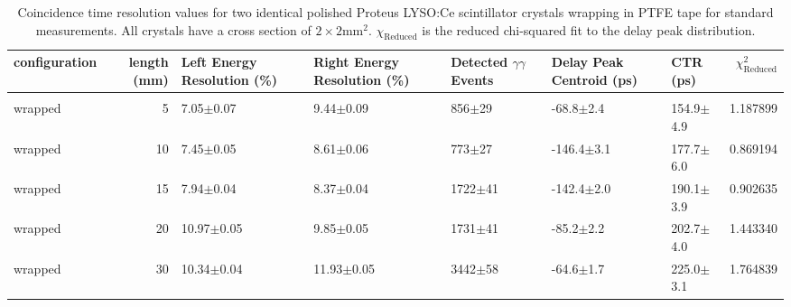 \begin{table}
\caption{\label{tab:standardctr} Coincidence time resolution values for two identical polished Proteus LYSO:Ce scintillator crystals wrapping in PTFE tape for standard measurements. All crystals have a cross section of $2\times2$mm$^2$. $\chi_\text{Reduced}$ is the reduced chi-squared fit to the delay peak distribution.}
\begin{tabular}{lrlllllr}
configuration &  length (mm) & Left Energy Resolution (\%) & Right Energy Resolution (\%) & Detected $\gamma\gamma$ Events & Delay Peak Centroid (ps) & CTR (ps) &  $\chi^2_\text{Reduced}$ \\
\hline
              &         &                      &                  &              &                 &                &             \\
      wrapped &       5 &        7.05$\pm$0.07 &    9.44$\pm$0.09 &   856$\pm$29 &   -68.8$\pm$2.4 &  154.9$\pm$4.9 &    1.187899 \\
      wrapped &      10 &        7.45$\pm$0.05 &    8.61$\pm$0.06 &   773$\pm$27 &  -146.4$\pm$3.1 &  177.7$\pm$6.0 &    0.869194 \\
      wrapped &      15 &        7.94$\pm$0.04 &    8.37$\pm$0.04 &  1722$\pm$41 &  -142.4$\pm$2.0 &  190.1$\pm$3.9 &    0.902635 \\
      wrapped &      20 &       10.97$\pm$0.05 &    9.85$\pm$0.05 &  1731$\pm$41 &   -85.2$\pm$2.2 &  202.7$\pm$4.0 &    1.443340 \\
      wrapped &      30 &       10.34$\pm$0.04 &   11.93$\pm$0.05 &  3442$\pm$58 &   -64.6$\pm$1.7 &  225.0$\pm$3.1 &    1.764839 \\
\hline
\end{tabular}
\end{table}
